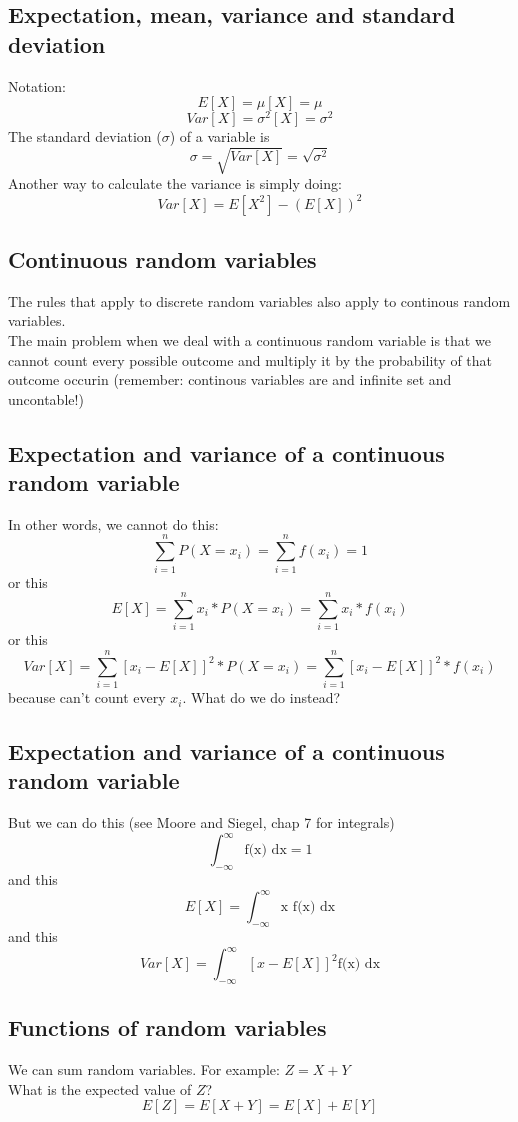 \documentclass[11pt]{article}
\begin{document}
	\subsection*{Expectation, mean, variance and standard deviation}
	Notation:
	\[E[X] = \mu[X] = \mu\]
	\[Var[X] = \sigma^2[X] = \sigma^2\]
	The standard deviation ($\sigma$) of a variable is
	\[\sigma = \sqrt{Var[X]} = \sqrt{\sigma^2}\]
	Another way to calculate the variance is simply doing: 
	\[Var[X] = E[X^2] - (E[X])^2\]	

	\subsection*{Continuous random variables}
	The rules that apply to discrete random variables also apply to continous random variables.
	\newline\\ The main problem when we deal with a continuous random variable is that we cannot count every possible outcome and multiply it by the probability of that outcome occurin (remember: continous variables are and infinite set and uncontable!)

	\subsection*{Expectation and variance of a continuous random variable}
	In other words, we cannot do this:
	\[\sum\limits_{i=1}^n P(X = x_i) = \sum\limits_{i=1}^n f(x_i) = 1\]
or this
		\[E[X] = \sum\limits_{i=1}^n x_i* P(X=x_i) =\sum\limits_{i=1}^n x_i * f(x_i)\]
or this
		\[Var[X] = \sum\limits_{i=1}^n[x_i - E[X]]^2 * P(X=x_i) =\sum\limits_{i=1}^n[x_i - E[X]]^2 * f(x_i)\]
		because can't count every $x_i$. What do we do instead?

	\subsection*{Expectation and variance of a continuous random variable}
	But we can do this (see Moore and Siegel, chap 7 for integrals)
	\[\int_{-\infty}^{\infty} \text{f(x) dx} = 1\]
and this
		\[E[X] = \int_{-\infty}^{\infty}  \text{x f(x) dx}\]
and this
		\[Var[X] = \int_{-\infty}^{\infty}  [x - E[X]]^2 \text{f(x) dx}\]


	\subsection*{Functions of random variables}
	We can sum random variables. For example: $Z=X+Y$
	\newline\\
	What is the expected value of $Z$?	
	\[E[Z] = E[X+Y] = E[X] + E[Y]\]
\end{document}
